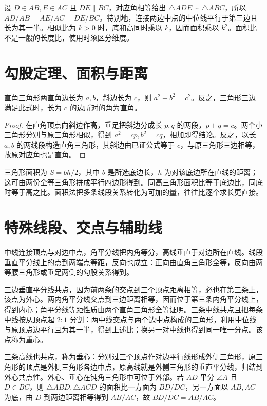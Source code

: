 设 $D\in AB,E\in AC$ 且 $DE\parallel BC$，对应角相等给出 $\triangle ADE\sim\triangle ABC$，所以 $AD/AB=AE/AC=DE/BC$。特别地，连接两边中点的中位线平行于第三边且长为其一半。相似比为 $k>0$ 时，底和高同时乘以 $k$，因而面积乘以 $k^2$。面积比不是一般的长度比，使用时须区分维度。

\section{勾股定理、面积与距离}
\begin{theorem}[勾股定理及逆定理]
直角三角形两直角边长为 $a,b$，斜边长为 $c$，则 $a^2+b^2=c^2$。反之，三角形三边满足此式时，长为 $c$ 的边所对的角为直角。
\end{theorem}
\begin{proof}
在直角顶点向斜边作高，垂足把斜边分成长 $p,q$ 的两段，$p+q=c$。两个小三角形分别与原三角形相似，得到 $a^2=cp,b^2=cq$，相加即得结论。反之，以长 $a,b$ 的两线段构造直角三角形，其斜边由已证公式等于 $c$，与原三角形三边相等，故原对应角也是直角。
\end{proof}
三角形面积为 $S=bh/2$，其中 $b$ 是所选底边长，$h$ 为对该底边所在直线的距离；这可由两份全等三角形拼成平行四边形得到。同高三角形面积比等于底边比，同底时等于高之比。面积法把多条线段关系转化为可加的量，往往比逐个求长更直接。

\section{特殊线段、交点与辅助线}
中线连接顶点与对边中点，角平分线把内角等分，高线垂直于对边所在直线。线段垂直平分线上的点到两端点等距，反向也成立：正向由直角三角形全等，反向由两等腰三角形或垂足两侧的勾股关系得到。

三边垂直平分线共点，因为前两条的交点到三个顶点距离相等，必也在第三条上，该点为外心。两内角平分线交点到三边距离相等，因而位于第三条内角平分线上，得到内心；角平分线等距性质由两个直角三角形全等证明。三条中线共点且把每条中线按从顶点起 $2:1$ 分割：两中线交点与两个边中点构成的三角形，利用中位线与原顶点边平行且为其一半，得到上述比；换另一对中线也得到同一唯一分点。该点称为重心。

三条高线也共点，称为垂心：分别过三个顶点作对边平行线形成外侧三角形，原三角形的顶点是外侧三角形各边中点，原高线就是外侧三角形的垂直平分线，归结到外心共点性。外心、垂心在钝角三角形中可位于外部。若 $AD$ 平分 $\angle A$ 且 $D\in BC$，则 $\triangle ABD,\triangle ACD$ 的面积比一方面为 $BD/DC$，另一方面以 $AB,AC$ 为底，由 $D$ 到两边距离相等得到 $AB/AC$，故 $BD/DC=AB/AC$。


